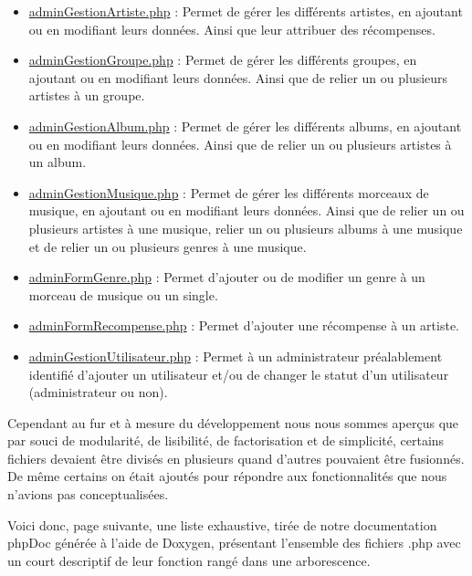 \begin{paragraphe}
\begin{itemize}
        			\item \underline{adminGestionArtiste.php} : Permet de gérer les différents artistes, en ajoutant ou en modifiant leurs données. Ainsi que leur attribuer des récompenses.
        			\item \underline{adminGestionGroupe.php} : Permet de gérer les différents groupes, en ajoutant ou en modifiant leurs données. Ainsi que de relier un ou plusieurs artistes à un groupe.
        			\item \underline{adminGestionAlbum.php} : Permet de gérer les différents albums, en ajoutant ou en modifiant leurs données. Ainsi que de relier un ou plusieurs artistes à un album.
        			\item \underline{adminGestionMusique.php} : Permet de gérer les différents morceaux de musique, en ajoutant ou en modifiant leurs données. Ainsi que de relier un ou plusieurs artistes à une musique, relier un ou plusieurs albums à une musique et de relier un ou plusieurs genres à une musique.
        			\item \underline{adminFormGenre.php} : Permet d'ajouter ou de modifier un genre à un morceau de musique ou un single.
        			\item \underline{adminFormRecompense.php} : Permet d'ajouter une récompense à un artiste.
        			\item \underline{adminGestionUtilisateur.php} : Permet à un administrateur préalablement identifié d'ajouter un utilisateur et/ou de changer le statut d'un utilisateur (administrateur ou non).
        		\end{itemize}
        	\end{paragraphe}

        	\begin{paragraphe}
                Cependant au fur et à mesure du développement nous nous sommes aperçus que par souci de modularité, de lisibilité, de factorisation et de simplicité,
                certains fichiers devaient être divisés en plusieurs quand d'autres pouvaient être fusionnés.
                De même certains on était ajoutés pour répondre aux fonctionnalités que nous n'avions pas conceptualisées.
            \end{paragraphe}

            \begin{paragraphe}
                Voici donc, page suivante, une liste exhaustive, tirée de notre documentation phpDoc générée à l'aide de Doxygen, présentant l'ensemble des fichiers .php avec un court descriptif de leur
                fonction rangé dans une arborescence.
            \end{paragraphe}


